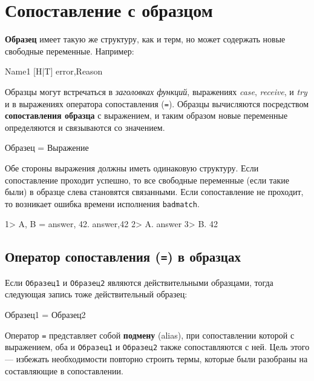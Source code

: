 \section{Сопоставление с образцом}

\textbf{Образец} имеет такую же структуру, как и терм, но может содержать новые
свободные переменные. Например:

\begin{erlang}
Name1
[H|T]
{error,Reason}
\end{erlang}

Образцы могут встречаться в \textit{заголовках функций}, выражениях 
\textit{case}, \textit{receive}, и \textit{try} и в выражениях оператора
сопоставления (\texttt{=}). Образцы вычисляются посредством 
\textbf{сопоставления образца} с выражением, и таким образом новые переменные
определяются и связываются со значением.

\begin{erlangru}
Образец = Выражение
\end{erlangru}

Обе стороны выражения должны иметь одинаковую структуру. Если сопоставление 
проходит успешно, то все свободные переменные (если такие были) в образце слева
становятся связанными. Если сопоставление не проходит, то возникает ошибка
времени исполнения \texttt{badmatch}.

\begin{erlang}
1> {A, B} = {answer, 42}.
{answer,42}
2> A.
answer
3> B.
42

\end{erlang}


\subsection{Оператор сопоставления (\texttt{=}) в образцах}

Если \texttt{Образец1} и \texttt{Образец2} являются действительными образцами, тогда следующая запись тоже действительный образец:

\begin{erlangru}
Образец1 = Образец2
\end{erlangru}

Оператор \texttt{=} представляет собой \textbf{подмену} (alias), при
сопоставлении которой с выражением, оба и \texttt{Образец1} и \texttt{Образец2}
также сопоставляются с ней. Цель этого --- избежать необходимости повторно
строить термы, которые были разобраны на составляющие в сопоставлении.

